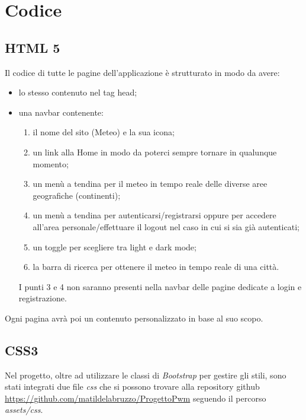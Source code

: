 \chapter{Codice}

\section{HTML 5}

Il codice di tutte le pagine dell'applicazione è strutturato in modo da avere:
\begin{itemize}
    \item lo stesso contenuto nel tag head;
    \item una navbar contenente:
          \begin{enumerate}
              \item il nome del sito (Meteo) e la sua icona;
              \item un link alla Home in modo da poterci sempre tornare in qualunque momento;
              \item un menù a tendina per il meteo in tempo reale delle diverse aree geografiche (continenti);
              \item un menù a tendina per autenticarsi/registrarsi oppure per accedere all'area personale/effettuare
                    il logout nel caso in cui si sia già autenticati;
              \item un toggle per scegliere tra light e dark mode;
              \item la barra di ricerca per ottenere il meteo in tempo reale di una città.
          \end{enumerate}
          I punti 3 e 4 non saranno presenti nella navbar delle pagine dedicate a login e registrazione.
\end{itemize}

\vspace{5mm}

Ogni pagina avrà poi un contenuto personalizzato in base al suo scopo.

\section{CSS3}

Nel progetto, oltre ad utilizzare le classi di \emph{Bootstrap} per gestire gli stili, sono stati integrati due file \emph{css} che si possono trovare alla repository github
\url{https://github.com/matildelabruzzo/ProgettoPwm} seguendo il percorso \emph{assets/css}.

